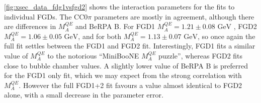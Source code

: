 \autoref{fig:xsec_data_fdg1vsfgd2} shows the interaction parameters for the fits to individual FGDs. The CC0$\pi$ parameters are mostly in agreement, although there are differences in $M_A^{QE}$ and BeRPA B. For FGD1 $M_A^{QE} = 1.21\pm0.08\text{ GeV}$ , FGD2 $M_A^{QE} = 1.06\pm0.05\text{ GeV}$, and for both $M_A^{QE} = 1.13\pm0.07\text{ GeV}$, so once again the full fit settles between the FGD1 and FGD2 fit. Interestingly, FGD1 fits a similar value of $M_A^{QE}$ to the notorious ``MiniBooNE $M_A^{QE}$ puzzle'', whereas FGD2 fits close to bubble chamber values. A slightly lower value of BeRPA B is preferred for the FGD1 only fit, which we may expect from the strong correlation with $M_A^{QE}$. However the full FGD1+2 fit favours a value almost identical to FGD2 alone, with a small decrease in the parameter error.

